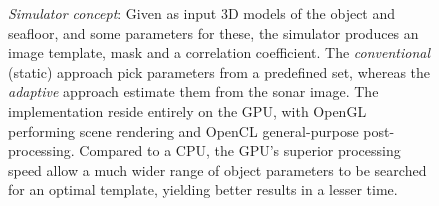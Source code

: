 \begin{figure}[t]
\fi
\caption{\emph{Simulator concept}: Given as input 3D models of the object and seafloor, and some parameters for these, the simulator produces an image template, mask and a correlation coefficient. The \emph{conventional} (static) approach pick parameters from a predefined set, whereas the \emph{adaptive} approach estimate them from the sonar image. The implementation reside entirely on the GPU, with OpenGL performing scene rendering and OpenCL general-purpose post-processing. Compared to a CPU, the GPU's superior processing speed allow a much wider range of object parameters to be searched for an optimal template, yielding better results in a lesser time.}\label{IV_buildup}%
\end{figure}

